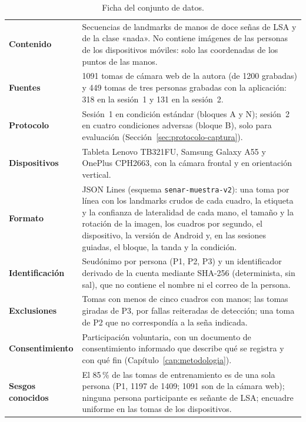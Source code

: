 \begin{table}[h]
    \centering
    \small
    \begin{tabular}{p{4cm}p{10cm}}
        \toprule
        \textbf{Contenido} & Secuencias de landmarks de manos de doce señas de LSA y de la clase «nada». No contiene imágenes de las personas de los dispositivos móviles: solo las coordenadas de los puntos de las manos. \\
        \textbf{Fuentes} & 1091 tomas de cámara web de la autora (de 1200 grabadas) y 449 tomas de tres personas grabadas con la aplicación: 318 en la sesión~1 y 131 en la sesión~2. \\
        \textbf{Protocolo} & Sesión~1 en condición estándar (bloques A y N); sesión~2 en cuatro condiciones adversas (bloque B), solo para evaluación (Sección~\ref{sec:protocolo-captura}). \\
        \textbf{Dispositivos} & Tableta Lenovo TB321FU, Samsung Galaxy A55 y OnePlus CPH2663, con la cámara frontal y en orientación vertical. \\
        \textbf{Formato} & JSON Lines (esquema \texttt{senar-muestra-v2}): una toma por línea con los landmarks crudos de cada cuadro, la etiqueta y la confianza de lateralidad de cada mano, el tamaño y la rotación de la imagen, los cuadros por segundo, el dispositivo, la versión de Android y, en las sesiones guiadas, el bloque, la tanda y la condición. \\
        \textbf{Identificación} & Seudónimo por persona (P1, P2, P3) y un identificador derivado de la cuenta mediante SHA-256 (determinista, sin sal), que no contiene el nombre ni el correo de la persona. \\
        \textbf{Exclusiones} & Tomas con menos de cinco cuadros con manos; las tomas giradas de P3, por fallas reiteradas de detección; una toma de P2 que no correspondía a la seña indicada. \\
        \textbf{Consentimiento} & Participación voluntaria, con un documento de consentimiento informado que describe qué se registra y con qué fin (Capítulo~\ref{cap:metodologia}). \\
        \textbf{Sesgos conocidos} & El 85\,\% de las tomas de entrenamiento es de una sola persona (P1, 1197 de 1409; 1091 son de la cámara web); ninguna persona participante es señante de LSA; encuadre uniforme en las tomas de los dispositivos. \\
        \bottomrule
    \end{tabular}
    \caption{Ficha del conjunto de datos.}
    \label{tab:ficha-datos}
\end{table}

